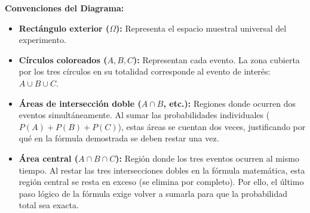 \documentclass{article}
\begin{document}
    \textbf{Convenciones del Diagrama:}
    \begin{itemize}
        \item \textbf{Rectángulo exterior ($\Omega$):} Representa el espacio muestral universal del experimento.
        \item \textbf{Círculos coloreados ($A, B, C$):} Representan cada evento. La zona cubierta por los tres círculos en su totalidad corresponde al evento de interés: $A \cup B \cup C$.
        \item \textbf{Áreas de intersección doble ($A \cap B$, etc.):} Regiones donde ocurren dos eventos simultáneamente. Al sumar las probabilidades individuales ($P(A)+P(B)+P(C)$), estas áreas se cuentan dos veces, justificando por qué en la fórmula demostrada se deben restar una vez.
        \item \textbf{Área central ($A \cap B \cap C$):} Región donde los tres eventos ocurren al mismo tiempo. Al restar las tres intersecciones dobles en la fórmula matemática, esta región central se resta en exceso (se elimina por completo). Por ello, el último paso lógico de la fórmula exige volver a sumarla para que la probabilidad total sea exacta.
    \end{itemize}
\end{document}
